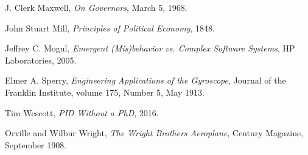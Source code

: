 \begin{thebibliography}{9}
    J. Clerk Maxwell,
    \emph{On Governors},
    March 5, 1968.

    John Stuart Mill,
    \emph{Principles of Political Economy},
    1848.

    Jeffrey C. Mogul,
    \emph{Emergent (Mis)behavior vs. Complex Software Systems},
    HP Laboratories,
    2005.

    Elmer A. Sperry,
    \emph{Engineering Applications of the Gyroscope},
    Journal of the Franklin Institute,
    volume 175,
    Number 5,
    May 1913.

    Tim Wescott,
    \emph{PID Without a PhD},
    2016.

    Orville and Wilbur Wright,
    \emph{The Wright Brothers Aeroplane},
    Century Magazine,
    September 1908.

\end{thebibliography}

